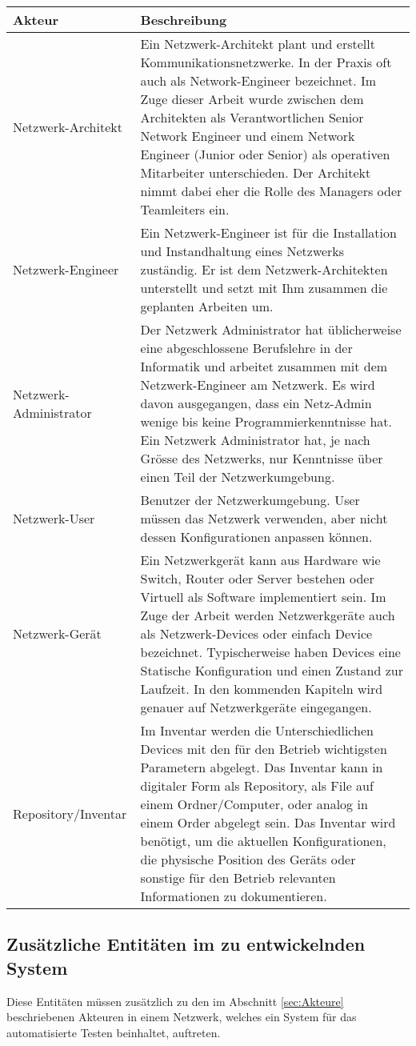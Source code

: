\documentclass[
	ngerman,
	toc=listof, %
	toc=bibliography, %
	footnotes=multiple, %
	parskip=half, %
	numbers=noendperiod %
]{scrartcl}
\begin{document}
	\begin{tabularx}{\textwidth}{lX}
			\toprule
			Akteur &  Beschreibung \\
			\midrule
			Netzwerk-Architekt  & Ein Netzwerk-Architekt plant und erstellt Kommunikationsnetzwerke. In der Praxis oft auch als Network-Engineer bezeichnet. Im Zuge dieser Arbeit wurde zwischen dem Architekten als Verantwortlichen Senior Network Engineer und einem Network Engineer (Junior oder Senior) als operativen Mitarbeiter unterschieden. Der Architekt nimmt dabei eher die Rolle des Managers oder Teamleiters ein. \\ 
			Netzwerk-Engineer  & Ein Netzwerk-Engineer ist für die Installation und Instandhaltung eines Netzwerks zuständig. Er ist dem Netzwerk-Architekten unterstellt und setzt mit Ihm zusammen die geplanten Arbeiten um. \\
			Netzwerk-Administrator  & Der Netzwerk Administrator hat üblicherweise eine abgeschlossene Berufslehre in der Informatik und arbeitet zusammen mit dem Netzwerk-Engineer am Netzwerk. Es wird davon ausgegangen, dass ein Netz-Admin wenige bis keine Programmierkenntnisse hat. Ein Netzwerk Administrator hat, je nach Grösse des Netzwerks, nur Kenntnisse über einen Teil der Netzwerkumgebung. \\
			Netzwerk-User & Benutzer der Netzwerkumgebung. User müssen das Netzwerk verwenden, aber nicht dessen Konfigurationen anpassen können. \\
			\midrule
			Netzwerk-Gerät  & Ein Netzwerkgerät kann aus Hardware wie Switch, Router oder Server bestehen oder Virtuell als Software implementiert sein. Im Zuge der Arbeit werden Netzwerkgeräte auch als Netzwerk-Devices oder einfach Device bezeichnet. Typischerweise haben Devices eine Statische Konfiguration und einen Zustand zur Laufzeit. In den kommenden Kapiteln wird genauer auf Netzwerkgeräte eingegangen. \\
			Repository/Inventar &  Im Inventar werden die Unterschiedlichen Devices mit den für den Betrieb wichtigsten Parametern abgelegt. Das Inventar kann in digitaler Form als Repository, als File auf einem Ordner/Computer, oder analog in einem Order abgelegt sein. Das Inventar wird benötigt, um die aktuellen Konfigurationen, die physische Position des Geräts oder sonstige für den Betrieb relevanten Informationen zu dokumentieren. \\
			\bottomrule
		\end{tabularx}
		\newpage

	\subsection{Zusätzliche Entitäten im zu entwickelnden System}
	Diese Entitäten müssen zusätzlich zu den im Abschnitt \ref{sec:Akteure} beschriebenen Akteuren in einem Netzwerk, welches ein System für das automatisierte Testen beinhaltet, auftreten.
	
\end{document}
